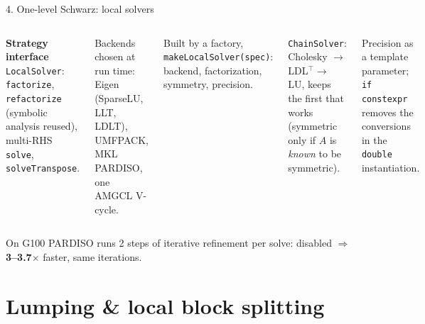 \documentclass[aspectratio=169,10pt]{beamer}
\newcommand{\code}[1]{\texttt{#1}}
\newcommand\Wone{{-28}{-57}{28}{6}}
\newcommand\mapsec[2]{\expandafter\cmsection#1{#2}}
\newcommand\mapbadge[1]{%
  \begin{tikzpicture}[remember picture,overlay]
    \node[anchor=north east,fill=white,rounded corners=1.2pt,inner sep=0.9pt]
      at ($(current page.north east)+(-1.8mm,-0.75mm)$) {\expandafter\cmthumb#1{17mm}};
  \end{tikzpicture}}
\begin{document}
\begin{frame}{4. One-level Schwarz: local solvers}
  \begin{columns}[T,onlytextwidth]
    \small
    \textbf{Strategy interface} \code{LocalSolver}: \code{factorize}, \code{refactorize} (symbolic analysis
    reused), multi-RHS \code{solve}, \code{solveTranspose}.
    
    \vspace{2mm}
    Backends chosen at run time: Eigen (SparseLU, LLT, LDLT), UMFPACK, MKL PARDISO, one AMGCL V-cycle.
    
    \vspace{2mm}
    Built by a \alert{factory}, \code{makeLocalSolver(spec)}: backend, factorization, symmetry, precision.
    
    \vspace{2mm}
    \code{ChainSolver}: Cholesky $\to$ LDL$^\top\to$ LU, keeps the first that works
            (symmetric only if $A$ is \emph{known} to be symmetric).
    
            \vspace{2mm}
    Precision as a \alert{template parameter}; \code{if constexpr} removes the conversions in the
            \code{double} instantiation.
    
    \centering
    \mapsec\Wone{0.98\linewidth}
  \end{columns}
  
  \begin{exampleblock}{On G100}
    \footnotesize PARDISO runs 2 steps of iterative refinement per solve: disabled
    $\Rightarrow$ \textbf{3--3.7$\times$} faster, same iterations.
  \end{exampleblock}
\end{frame}

\section{Lumping \& local block splitting}
\end{document}
